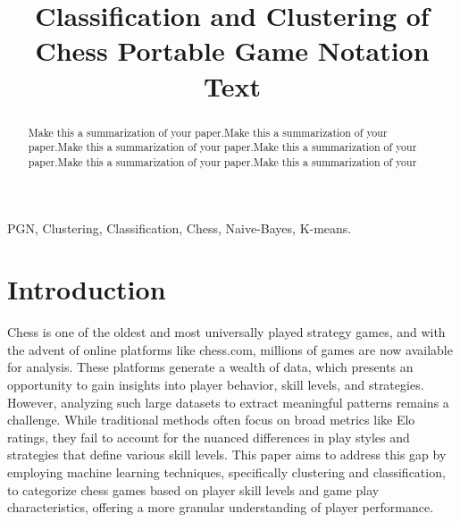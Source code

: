 \documentclass[conference]{IEEEtran}
\begin{document}
\title{Classification and Clustering of Chess Portable Game Notation Text\\
}

\author{
\and
{}
}

\maketitle

\begin{abstract}
Make this a summarization of your paper.Make this a summarization of your paper.Make this a summarization of your paper.Make this a summarization of your paper.Make this a summarization of your paper.Make this a summarization of your 
\end{abstract}

\begin{IEEEkeywords}
PGN, Clustering, Classification, Chess, Naive-Bayes, K-means.
\end{IEEEkeywords}

\section{Introduction}
Chess is one of the oldest and most universally played strategy games, and with the advent of online platforms like chess.com, millions of games are now available for analysis. These platforms generate a wealth of data, which presents an opportunity to gain insights into player behavior, skill levels, and strategies. However, analyzing such large datasets to extract meaningful patterns remains a challenge. While traditional methods often focus on broad metrics like Elo ratings, they fail to account for the nuanced differences in play styles and strategies that define various skill levels. This paper aims to address this gap by employing machine learning techniques, specifically clustering and classification, to categorize chess games based on player skill levels and game play characteristics, offering a more granular understanding of player performance.
\end{document}
